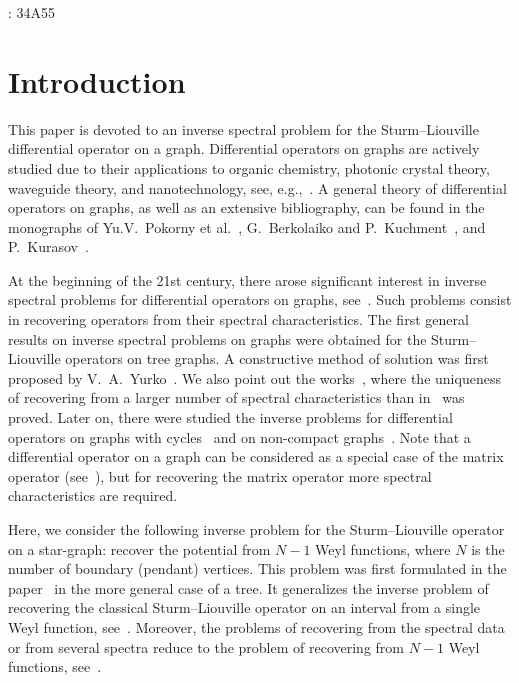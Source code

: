\documentclass[a4paper, 12pt] {article}
\theoremstyle{plain}
\theoremstyle{remark}
\theoremstyle{plain}
\theoremstyle{definition}
\numberwithin{equation}{section}
\begin{document}
\medskip
{}: 34A55
\\


\section{Introduction}
This paper is devoted to an inverse spectral problem for the Sturm--Liouville differential operator on a graph.
Differential operators on graphs are actively studied due to their applications to organic chemistry, photonic crystal theory, waveguide theory, and nanotechnology, see, e.g.,~\cite{swen, kuchment, korot}.
A general theory of differential operators on graphs, as well as an extensive bibliography, can be found in the monographs of Yu.V.~Pokorny et al.~\cite{pok}, G.~Berkolaiko and P.~Kuchment~\cite{berk}, and P.~Kurasov~\cite{kur}.

At the beginning of the 21st century, there arose significant interest in inverse spectral problems for differential operators on graphs, see~\cite{kur,avd,umn,A,yur-cycle,cycle,bessel,A-ign,moch,Liu,but,wang,part,arxiv,ign,brown,bel,yurko2005,math,filippo,finco,piv,fam,tree}.
Such problems consist in recovering operators from their spectral characteristics.
The first general results on inverse spectral problems on graphs were obtained for the Sturm--Liouville operators on tree graphs.
A constructive method of solution was first proposed by V.~A.~Yurko~\cite{yurko2005}. 
We also point out the works~\cite{bel,brown}, where the uniqueness of recovering from a larger number of spectral characteristics than in~\cite{yurko2005} was proved.
Later on, there were studied the inverse problems for differential operators on graphs with cycles~\cite{umn,A,yur-cycle,cycle,kur} and on non-compact graphs~\cite{umn,bessel,A-ign,moch}.
Note that a differential operator on a graph can be considered as a special case of the matrix operator (see~\cite{AMP,ipse,xu}), but for recovering the matrix operator more spectral characteristics are required.

Here, we consider the following inverse problem for the Sturm--Liouville operator on a star-graph: recover the potential from $N-1$ Weyl functions, where $N$ is the number of boundary (pendant) vertices.
This problem was first formulated
in the paper~\cite{yurko2005} in the more general case of a tree. It generalizes the inverse problem of recovering the classical Sturm--Liouville operator on an interval from a single Weyl function, see~\cite{freil}. Moreover, the problems of recovering from the spectral data or from several spectra reduce to the problem of recovering from $N-1$ Weyl functions, see~\cite{umn}.
\end{document}
